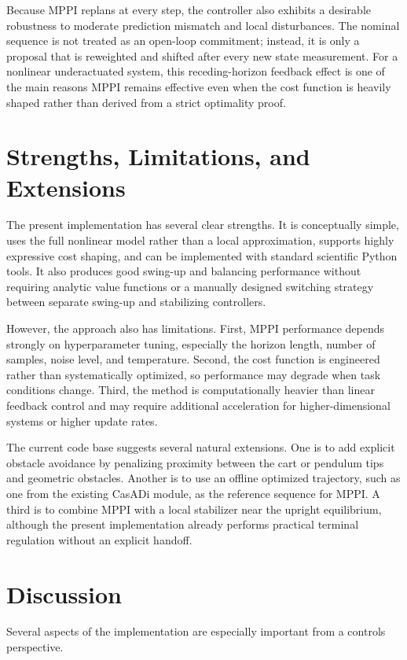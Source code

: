 \documentclass[conference]{IEEEtran}
\begin{document}
Because MPPI replans at every step, the controller also exhibits a desirable robustness to moderate prediction mismatch and local disturbances. The nominal sequence is not treated as an open-loop commitment; instead, it is only a proposal that is reweighted and shifted after every new state measurement. For a nonlinear underactuated system, this receding-horizon feedback effect is one of the main reasons MPPI remains effective even when the cost function is heavily shaped rather than derived from a strict optimality proof.

\section{Strengths, Limitations, and Extensions}
The present implementation has several clear strengths. It is conceptually simple, uses the full nonlinear model rather than a local approximation, supports highly expressive cost shaping, and can be implemented with standard scientific Python tools. It also produces good swing-up and balancing performance without requiring analytic value functions or a manually designed switching strategy between separate swing-up and stabilizing controllers.

However, the approach also has limitations. First, MPPI performance depends strongly on hyperparameter tuning, especially the horizon length, number of samples, noise level, and temperature. Second, the cost function is engineered rather than systematically optimized, so performance may degrade when task conditions change. Third, the method is computationally heavier than linear feedback control and may require additional acceleration for higher-dimensional systems or higher update rates.

The current code base suggests several natural extensions. One is to add explicit obstacle avoidance by penalizing proximity between the cart or pendulum tips and geometric obstacles. Another is to use an offline optimized trajectory, such as one from the existing CasADi module, as the reference sequence for MPPI. A third is to combine MPPI with a local stabilizer near the upright equilibrium, although the present implementation already performs practical terminal regulation without an explicit handoff.

\section{Discussion}
Several aspects of the implementation are especially important from a controls perspective.
\end{document}
